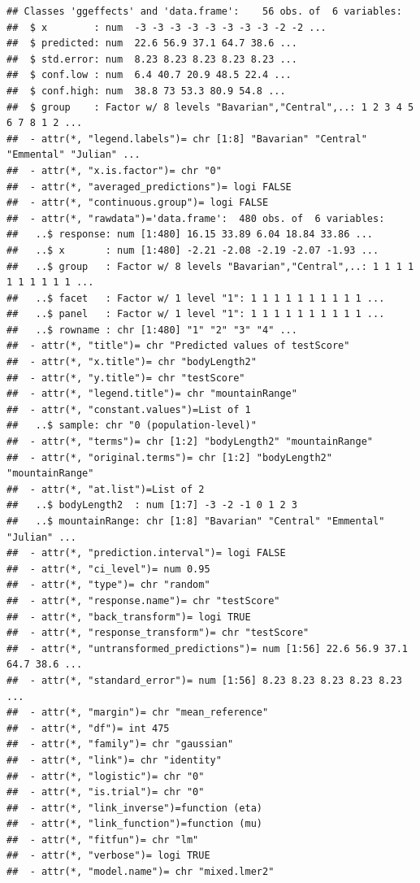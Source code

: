 \documentclass[
]{article}
\begin{document}
\begin{verbatim}
## Classes 'ggeffects' and 'data.frame':    56 obs. of  6 variables:
##  $ x        : num  -3 -3 -3 -3 -3 -3 -3 -3 -2 -2 ...
##  $ predicted: num  22.6 56.9 37.1 64.7 38.6 ...
##  $ std.error: num  8.23 8.23 8.23 8.23 8.23 ...
##  $ conf.low : num  6.4 40.7 20.9 48.5 22.4 ...
##  $ conf.high: num  38.8 73 53.3 80.9 54.8 ...
##  $ group    : Factor w/ 8 levels "Bavarian","Central",..: 1 2 3 4 5 6 7 8 1 2 ...
##  - attr(*, "legend.labels")= chr [1:8] "Bavarian" "Central" "Emmental" "Julian" ...
##  - attr(*, "x.is.factor")= chr "0"
##  - attr(*, "averaged_predictions")= logi FALSE
##  - attr(*, "continuous.group")= logi FALSE
##  - attr(*, "rawdata")='data.frame':  480 obs. of  6 variables:
##   ..$ response: num [1:480] 16.15 33.89 6.04 18.84 33.86 ...
##   ..$ x       : num [1:480] -2.21 -2.08 -2.19 -2.07 -1.93 ...
##   ..$ group   : Factor w/ 8 levels "Bavarian","Central",..: 1 1 1 1 1 1 1 1 1 1 ...
##   ..$ facet   : Factor w/ 1 level "1": 1 1 1 1 1 1 1 1 1 1 ...
##   ..$ panel   : Factor w/ 1 level "1": 1 1 1 1 1 1 1 1 1 1 ...
##   ..$ rowname : chr [1:480] "1" "2" "3" "4" ...
##  - attr(*, "title")= chr "Predicted values of testScore"
##  - attr(*, "x.title")= chr "bodyLength2"
##  - attr(*, "y.title")= chr "testScore"
##  - attr(*, "legend.title")= chr "mountainRange"
##  - attr(*, "constant.values")=List of 1
##   ..$ sample: chr "0 (population-level)"
##  - attr(*, "terms")= chr [1:2] "bodyLength2" "mountainRange"
##  - attr(*, "original.terms")= chr [1:2] "bodyLength2" "mountainRange"
##  - attr(*, "at.list")=List of 2
##   ..$ bodyLength2  : num [1:7] -3 -2 -1 0 1 2 3
##   ..$ mountainRange: chr [1:8] "Bavarian" "Central" "Emmental" "Julian" ...
##  - attr(*, "prediction.interval")= logi FALSE
##  - attr(*, "ci_level")= num 0.95
##  - attr(*, "type")= chr "random"
##  - attr(*, "response.name")= chr "testScore"
##  - attr(*, "back_transform")= logi TRUE
##  - attr(*, "response_transform")= chr "testScore"
##  - attr(*, "untransformed_predictions")= num [1:56] 22.6 56.9 37.1 64.7 38.6 ...
##  - attr(*, "standard_error")= num [1:56] 8.23 8.23 8.23 8.23 8.23 ...
##  - attr(*, "margin")= chr "mean_reference"
##  - attr(*, "df")= int 475
##  - attr(*, "family")= chr "gaussian"
##  - attr(*, "link")= chr "identity"
##  - attr(*, "logistic")= chr "0"
##  - attr(*, "is.trial")= chr "0"
##  - attr(*, "link_inverse")=function (eta)  
##  - attr(*, "link_function")=function (mu)  
##  - attr(*, "fitfun")= chr "lm"
##  - attr(*, "verbose")= logi TRUE
##  - attr(*, "model.name")= chr "mixed.lmer2"
\end{verbatim}
\end{document}
